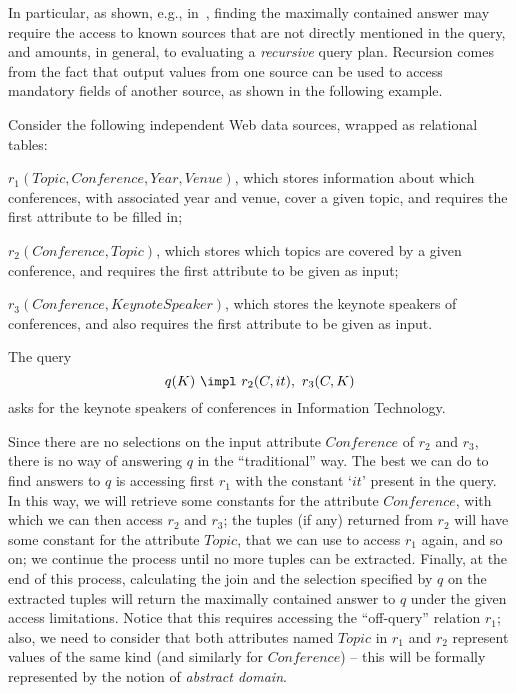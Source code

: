 
In particular, as shown, e.g., in~\cite{RaSU95,LiCh00}, finding the maximally contained answer may require the access to known sources that are not directly mentioned in the query, and amounts, in general, to evaluating a \emph{recursive} query plan.
%
Recursion comes from the fact that output values from one source can be used to access mandatory fields of another source, as shown in the following example.

\begin{example}\label{exa:limitations}
  Consider the following independent Web data sources, wrapped as relational tables:\\
\begin{longitem}
	\item $r_1(\mathit{Topic}, \mathit{Conference}, \mathit{Year}, \mathit{Venue})$,
  which stores information about which conferences, with associated year and
  venue, cover a given topic, and requires the first attribute to be filled in;
	\item $r_2(\mathit{Conference},\mathit{Topic})$, which stores which topics are
  covered by a given conference, and requires the first attribute to be given
  as input;
	\item $r_3(\mathit{Conference},\mathit{KeynoteSpeaker})$, which stores the
	  keynote speakers of conferences, and also requires the first attribute to be given as input.
\end{longitem}
%
  The query
  \[
  q(K) ~\impl~ r_2(C, it), ~r_3(C, K)
  \]
  asks for the keynote speakers of conferences in Information Technology.

  Since there are no selections on the input attribute $\mathit{Conference}$ of $r_2$ and $r_3$, there is no way of answering $q$ in the ``traditional'' way.
The best we can do to find answers to $q$ is accessing first
  $r_1$ with the constant `$it$' present in the query.  In this way, we will
  retrieve some constants for the attribute $\mathit{Conference}$, with which
  we can then access $r_2$ and $r_3$; the tuples (if any) returned from $r_2$
  will have some constant for the attribute $\mathit{Topic}$, that we can use
  to access $r_1$ again, and so on; we continue the process until no more
  tuples can be extracted.  Finally, at the end of this process,
  calculating the join and the selection specified by $q$ on the extracted
  tuples will return the maximally contained answer to $q$ under the given access
  limitations.  Notice that this requires accessing the ``off-query'' relation
  $r_1$; also, we need to consider that both attributes named $\mathit{Topic}$
  in $r_1$ and $r_2$ represent values of the same kind (and similarly for
  $\mathit{Conference}$) -- this will be formally represented by the notion of
  \emph{abstract domain}.
%
\end{example}


